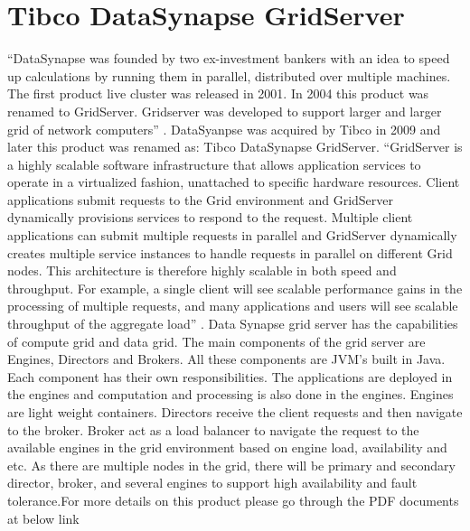 \section{Tibco DataSynapse GridServer}

“DataSynapse was founded by two ex-investment bankers with an idea to speed up calculations by running them in parallel, 
distributed over multiple machines. The first product live cluster was released in 2001. 
In 2004 this product was renamed to GridServer. Gridserver was developed to support larger 
and larger grid of network computers” \cite{hid-sp18-514-datasynapsewiki}.
DataSyanpse was acquired by Tibco in 2009 and later this product was renamed as: 
Tibco DataSynapse GridServer\cite{hid-sp18-514-tibcodatasynapsewiki}.
“GridServer is a highly scalable software infrastructure that allows application services to operate in a virtualized fashion, 
unattached to specific hardware resources. Client applications submit requests to the Grid environment 
and GridServer dynamically provisions services to respond to the request. 
Multiple client applications can submit multiple requests in parallel and GridServer dynamically 
creates multiple service instances to handle requests in parallel on different Grid nodes. 
This architecture is therefore highly scalable in both speed and throughput. For example, 
a single client will see scalable performance gains in the processing of multiple requests, 
and many applications and users will see scalable throughput of the aggregate load” \cite{hid-sp18-514-tibcods}.
Data Synapse grid server has the capabilities of compute grid and data grid. The main components of the grid server are Engines, 
Directors and Brokers. All these components are JVM’s built in Java.  
Each component has their own responsibilities. The applications are deployed in the engines and computation and processing 
is also done in the engines. Engines are light weight containers. Directors receive the client requests 
and then navigate to the broker. Broker act as a load balancer to navigate the request to the available engines 
in the grid environment based on engine load, availability and etc. As there are multiple nodes in the grid, 
there will be primary and secondary director, broker, and several engines to support high availability 
and fault tolerance\cite{hid-sp18-514-tibcods}.For more details on this product 
please go through the PDF documents at below link


